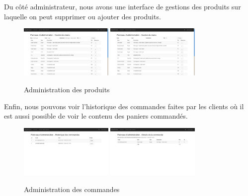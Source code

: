 Du côté administrateur, nous avons une interface de gestions des produits sur
laquelle on peut supprimer ou ajouter des produits.

\begin{figure}[H]
	\centering
	\includegraphics[width=0.4\textwidth]{res/ajout_burger.png} 
	\includegraphics[width=0.4\textwidth]{res/ajout_burger2.png}
	\caption{Administration des produits}
	\label{fig:food_admin}
\end{figure}

Enfin, nous pouvons voir l'historique des commandes faites par les clients où
il est aussi possible de voir le contenu des paniers commandés.

\begin{figure}[H]
	\centering
	\includegraphics[width=0.4\textwidth]{res/admin_histo1.png} 
	\includegraphics[width=0.4\textwidth]{res/admin_histo2.png}
	\caption{Administration des commandes}
	\label{fig:order_admin}
\end{figure}

